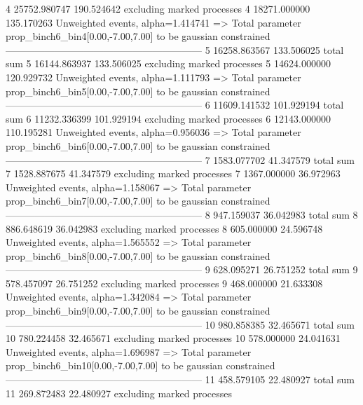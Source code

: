 4          25752.980747    190.524642      excluding marked processes    
4          18271.000000    135.170263      Unweighted events, alpha=1.414741
  => Total parameter prop_binch6_bin4[0.00,-7.00,7.00] to be gaussian constrained
------------------------------------------------------------
5          16258.863567    133.506025      total sum                     
5          16144.863937    133.506025      excluding marked processes    
5          14624.000000    120.929732      Unweighted events, alpha=1.111793
  => Total parameter prop_binch6_bin5[0.00,-7.00,7.00] to be gaussian constrained
------------------------------------------------------------
6          11609.141532    101.929194      total sum                     
6          11232.336399    101.929194      excluding marked processes    
6          12143.000000    110.195281      Unweighted events, alpha=0.956036
  => Total parameter prop_binch6_bin6[0.00,-7.00,7.00] to be gaussian constrained
------------------------------------------------------------
7          1583.077702     41.347579       total sum                     
7          1528.887675     41.347579       excluding marked processes    
7          1367.000000     36.972963       Unweighted events, alpha=1.158067
  => Total parameter prop_binch6_bin7[0.00,-7.00,7.00] to be gaussian constrained
------------------------------------------------------------
8          947.159037      36.042983       total sum                     
8          886.648619      36.042983       excluding marked processes    
8          605.000000      24.596748       Unweighted events, alpha=1.565552
  => Total parameter prop_binch6_bin8[0.00,-7.00,7.00] to be gaussian constrained
------------------------------------------------------------
9          628.095271      26.751252       total sum                     
9          578.457097      26.751252       excluding marked processes    
9          468.000000      21.633308       Unweighted events, alpha=1.342084
  => Total parameter prop_binch6_bin9[0.00,-7.00,7.00] to be gaussian constrained
------------------------------------------------------------
10         980.858385      32.465671       total sum                     
10         780.224458      32.465671       excluding marked processes    
10         578.000000      24.041631       Unweighted events, alpha=1.696987
  => Total parameter prop_binch6_bin10[0.00,-7.00,7.00] to be gaussian constrained
------------------------------------------------------------
11         458.579105      22.480927       total sum                     
11         269.872483      22.480927       excluding marked processes    
